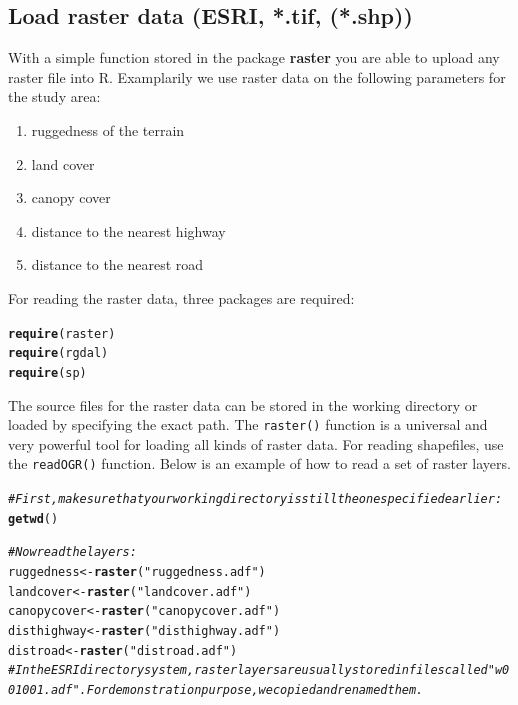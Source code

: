 \documentclass[11pt, a4paper]{article}\usepackage[]{graphicx}\usepackage[]{color}
\makeatletter
\newcommand{\hlstr}[1]{\textcolor[rgb]{0.192,0.494,0.8}{#1}}%
\newcommand{\hlcom}[1]{\textcolor[rgb]{0.678,0.584,0.686}{\textit{#1}}}%
\newcommand{\hlstd}[1]{\textcolor[rgb]{0.345,0.345,0.345}{#1}}%
\newcommand{\hlkwb}[1]{\textcolor[rgb]{0.69,0.353,0.396}{#1}}%
\newcommand{\hlkwd}[1]{\textcolor[rgb]{0.737,0.353,0.396}{\textbf{#1}}}%
\newenvironment{kframe}{%
 \def\at@end@of@kframe{}%
 \ifinner\ifhmode%
  \def\at@end@of@kframe{\end{minipage}}%
  \begin{minipage}{\columnwidth}%
 \fi\fi%
 \def\FrameCommand##1{\hskip\@totalleftmargin \hskip-\fboxsep
 \colorbox{shadecolor}{##1}\hskip-\fboxsep
     \hskip-\linewidth \hskip-\@totalleftmargin \hskip\columnwidth}%
 \MakeFramed {\advance\hsize-\width
   \@totalleftmargin\z@ \linewidth\hsize
   \@setminipage}}%
 {\par\unskip\endMakeFramed%
 \at@end@of@kframe}
\newenvironment{knitrout}{}{} %
\makeatother
\begin{document}
\subsection{Load raster data (ESRI, *.tif, (*.shp))}%

With a simple function stored in the package \textbf{raster} you are able to upload any raster file into R. Examplarily we use raster data on the following parameters for the study area:
\begin{enumerate}
\item{ruggedness of the terrain}
\item{land cover}
\item{canopy cover}
\item{distance to the nearest highway}
\item{distance to the nearest road}
\end{enumerate}

For reading the raster data, three packages are required:
\begin{knitrout}
\color{fgcolor}\begin{kframe}
\begin{alltt}
\hlkwd{require}\hlstd{(raster)}
\hlkwd{require}\hlstd{(rgdal)}
\hlkwd{require}\hlstd{(sp)}
\end{alltt}
\end{kframe}
\end{knitrout}

The source files for the raster data can be stored in the working directory or loaded by specifying the exact path. The \texttt{raster()} function is a universal and very powerful tool for loading all kinds of raster data. For reading shapefiles, use the \texttt{readOGR()} function. Below is an example of how to read a set of raster layers.
\begin{knitrout}
\color{fgcolor}\begin{kframe}
\begin{alltt}
\hlcom{# First, make sure that your working directory is still the one specified earlier:}
\hlkwd{getwd}\hlstd{()}

\hlcom{# Now read the layers:}
\hlstd{ruggedness} \hlkwb{<-} \hlkwd{raster}\hlstd{(}\hlstr{"ruggedness.adf"}\hlstd{)}
\hlstd{landcover} \hlkwb{<-} \hlkwd{raster}\hlstd{(}\hlstr{"landcover.adf"}\hlstd{)}
\hlstd{canopycover} \hlkwb{<-} \hlkwd{raster}\hlstd{(}\hlstr{"canopycover.adf"}\hlstd{)}
\hlstd{disthighway} \hlkwb{<-} \hlkwd{raster}\hlstd{(}\hlstr{"disthighway.adf"}\hlstd{)}
\hlstd{distroad} \hlkwb{<-} \hlkwd{raster}\hlstd{(}\hlstr{"distroad.adf"}\hlstd{)}
\hlcom{# In the ESRI directory system, raster layers are usually stored in files called "w001001.adf". For demonstration purpose, we copied and renamed them.}
\end{alltt}
\end{kframe}
\end{knitrout}
\end{document}
